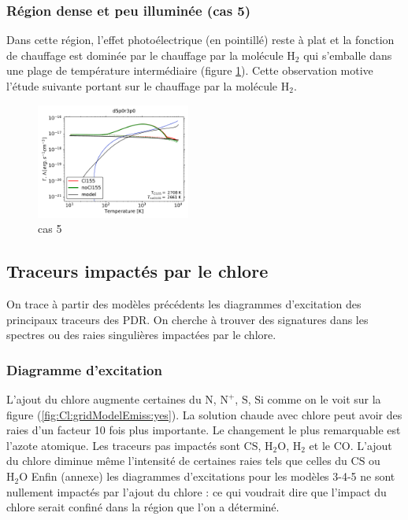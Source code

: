 \subsubsection{Région dense et peu illuminée (cas 5)}

Dans cette région, l'effet photoélectrique (en pointillé) reste à plat et la fonction de chauffage est dominée par le chauffage par la molécule $\mathrm{H}_2$ qui s'emballe dans une plage de température intermédiaire (figure \ref{fig:Cl:particuliers:chofra5}). Cette observation motive l'étude suivante portant sur le chauffage par la molécule $\mathrm{H}_2$.

\begin{figure}[!htbp]
    \centering
    \includegraphics[trim = {0 0 0 0},clip,width=0.45\textwidth]{figure/Cl/particuliers/chofra3_d5p0r3p0_d5p0r3p0.pdf}
        \caption{cas 5}
    \label{fig:Cl:particuliers:chofra5}
\end{figure}

\subsection{Traceurs impactés par le chlore}
On trace à partir des modèles précédents les diagrammes d'excitation des principaux traceurs des PDR. On cherche à trouver des signatures dans les spectres ou des raies singulières impactées par le chlore. 

\subsubsection{Diagramme d'excitation}

L'ajout du chlore augmente certaines du $\mathrm{N}$, $\mathrm{N}^+$, $\mathrm{S}$, $\mathrm{Si}$ comme on le voit sur la figure (\autoref{fig:Cl:gridModelEmiss:yes}). La solution chaude avec chlore peut avoir des raies d'un facteur 10 fois plus importante. Le changement le plus remarquable est l'azote atomique. Les traceurs pas impactés sont $\mathrm{CS}$, $\mathrm{H}_2\mathrm{O}$, $\mathrm{H}_2$ et le $\mathrm{CO}$. L'ajout du chlore diminue même l'intensité de certaines raies tels que celles du $\mathrm{CS}$ ou $\mathrm{H}_2\mathrm{O}$ Enfin (annexe) les diagrammes d'excitations pour les modèles 3-4-5 ne sont nullement impactés par l'ajout du chlore : ce qui voudrait dire que l'impact du chlore serait confiné dans la région que l'on a déterminé.

